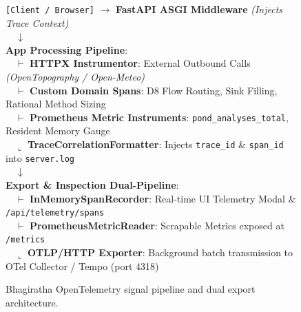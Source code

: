 \documentclass[11pt,a4paper]{article}
\begin{document}
\begin{figure}[htbp]
\centering
\begin{tcolorbox}[colback=CardBg,colframe=NavyBlue,arc=3pt,boxrule=0.6pt,title={\sffamily\bfseries\small Architectural Signal Flow: From Ingress to Inspection}]
\centering
\small
\begin{minipage}{0.96\textwidth}
\texttt{[Client / Browser]} $\longrightarrow$ \textbf{FastAPI ASGI Middleware} \textit{(Injects Trace Context)}\\
$\quad\downarrow$\\
\textbf{App Processing Pipeline}:\\
$\quad\vdash$ \textbf{HTTPX Instrumentor}: External Outbound Calls \textit{(OpenTopography / Open-Meteo)}\\
$\quad\vdash$ \textbf{Custom Domain Spans}: D8 Flow Routing, Sink Filling, Rational Method Sizing\\
$\quad\vdash$ \textbf{Prometheus Metric Instruments}: \texttt{pond\_analyses\_total}, Resident Memory Gauge\\
$\quad\llcorner$ \textbf{TraceCorrelationFormatter}: Injects \texttt{trace\_id} \& \texttt{span\_id} into \texttt{server.log}\\
$\quad\downarrow$\\
\textbf{Export \& Inspection Dual-Pipeline}:\\
$\quad\vdash$ \textbf{InMemorySpanRecorder}: Real-time UI Telemetry Modal \& \texttt{/api/telemetry/spans}\\
$\quad\vdash$ \textbf{PrometheusMetricReader}: Scrapable Metrics exposed at \texttt{/metrics}\\
$\quad\llcorner$ \textbf{OTLP/HTTP Exporter}: Background batch transmission to OTel Collector / Tempo (port 4318)
\end{minipage}
\end{tcolorbox}
\caption{Bhagiratha OpenTelemetry signal pipeline and dual export architecture.}
\label{fig:arch_flow}
\end{figure}
\end{document}
